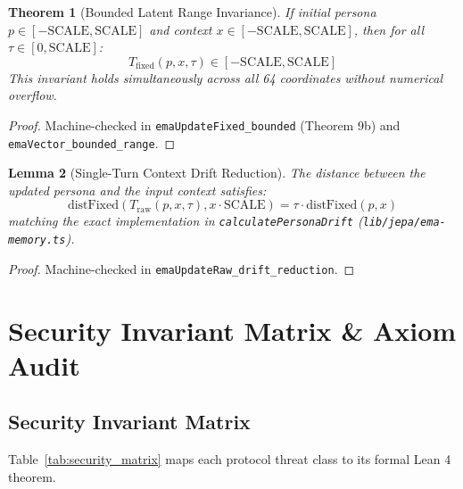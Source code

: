 \documentclass[11pt,a4paper]{article}
\theoremstyle{plain}
\newtheorem{theorem}{Theorem}[section]
\newtheorem{lemma}[theorem]{Lemma}
\theoremstyle{definition}
\theoremstyle{remark}
\begin{document}
\begin{theorem}[Bounded Latent Range Invariance]
\label{thm:jepa_bounded}
If initial persona $p \in [-\text{SCALE}, \text{SCALE}]$ and context $x \in [-\text{SCALE}, \text{SCALE}]$, then for all $\tau \in [0, \text{SCALE}]$:
\begin{equation}
    T_{\text{fixed}}(p, x, \tau) \in [-\text{SCALE}, \text{SCALE}]
\end{equation}
This invariant holds simultaneously across all 64 coordinates without numerical overflow.
\end{theorem}
\begin{proof}
Machine-checked in \texttt{emaUpdateFixed\_bounded} (Theorem 9b) and \texttt{emaVector\_bounded\_range}.
\end{proof}

\begin{lemma}[Single-Turn Context Drift Reduction]
\label{lem:jepa_drift}
The distance between the updated persona and the input context satisfies:
\begin{equation}
    \text{distFixed}(T_{\text{raw}}(p, x, \tau), x \cdot \text{SCALE}) = \tau \cdot \text{distFixed}(p, x)
\end{equation}
matching the exact implementation in \texttt{calculatePersonaDrift} (\texttt{lib/jepa/ema-memory.ts}).
\end{lemma}
\begin{proof}
Machine-checked in \texttt{emaUpdateRaw\_drift\_reduction}.
\end{proof}

\section{Security Invariant Matrix \& Axiom Audit}

\subsection{Security Invariant Matrix}

Table~\ref{tab:security_matrix} maps each protocol threat class to its formal Lean 4 theorem.
\end{document}
